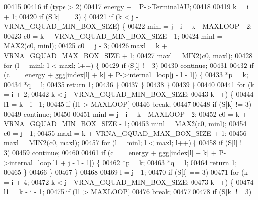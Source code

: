 \begin{DoxyCode}
00415 
00416   \textcolor{keywordflow}{if} (type > 2)
00417     energy += P->TerminalAU;
00418 
00419   k = i + 1;
00420   \textcolor{keywordflow}{if} (S[k] == 3) \{
00421     \textcolor{keywordflow}{if} (k < j - VRNA\_GQUAD\_MIN\_BOX\_SIZE) \{
00422       minl  = j - i + k - MAXLOOP - 2;
00423       c0    = k + VRNA\_GQUAD\_MIN\_BOX\_SIZE - 1;
00424       minl  = \hyperlink{group__utils_ga33297b3679c713b0c4d897cd0fe3b122}{MAX2}(c0, minl);
00425       c0    = j - 3;
00426       maxl  = k + VRNA\_GQUAD\_MAX\_BOX\_SIZE + 1;
00427       maxl  = \hyperlink{group__utils_gae0b9cd0ce090bd69b951aa73e8fa4f7d}{MIN2}(c0, maxl);
00428       \textcolor{keywordflow}{for} (l = minl; l < maxl; l++) \{
00429         \textcolor{keywordflow}{if} (S[l] != 3)
00430           \textcolor{keywordflow}{continue};
00431 
00432         \textcolor{keywordflow}{if} (c == energy + ggg[index[l] + k] + P->internal\_loop[j - l - 1]) \{
00433           *p  = k;
00434           *q  = l;
00435           \textcolor{keywordflow}{return} 1;
00436         \}
00437       \}
00438     \}
00439   \}
00440 
00441   \textcolor{keywordflow}{for} (k = i + 2;
00442        k < j - VRNA\_GQUAD\_MIN\_BOX\_SIZE;
00443        k++) \{
00444     l1 = k - i - 1;
00445     \textcolor{keywordflow}{if} (l1 > MAXLOOP)
00446       \textcolor{keywordflow}{break};
00447 
00448     \textcolor{keywordflow}{if} (S[k] != 3)
00449       \textcolor{keywordflow}{continue};
00450 
00451     minl  = j - i + k - MAXLOOP - 2;
00452     c0    = k + VRNA\_GQUAD\_MIN\_BOX\_SIZE - 1;
00453     minl  = \hyperlink{group__utils_ga33297b3679c713b0c4d897cd0fe3b122}{MAX2}(c0, minl);
00454     c0    = j - 1;
00455     maxl  = k + VRNA\_GQUAD\_MAX\_BOX\_SIZE + 1;
00456     maxl  = \hyperlink{group__utils_gae0b9cd0ce090bd69b951aa73e8fa4f7d}{MIN2}(c0, maxl);
00457     \textcolor{keywordflow}{for} (l = minl; l < maxl; l++) \{
00458       \textcolor{keywordflow}{if} (S[l] != 3)
00459         \textcolor{keywordflow}{continue};
00460 
00461       \textcolor{keywordflow}{if} (c == energy + ggg[index[l] + k] + P->internal\_loop[l1 + j - l - 1]) \{
00462         *p  = k;
00463         *q  = l;
00464         \textcolor{keywordflow}{return} 1;
00465       \}
00466     \}
00467   \}
00468 
00469   l = j - 1;
00470   \textcolor{keywordflow}{if} (S[l] == 3)
00471     \textcolor{keywordflow}{for} (k = i + 4;
00472          k < j - VRNA\_GQUAD\_MIN\_BOX\_SIZE;
00473          k++) \{
00474       l1 = k - i - 1;
00475       \textcolor{keywordflow}{if} (l1 > MAXLOOP)
00476         \textcolor{keywordflow}{break};
00477 
00478       \textcolor{keywordflow}{if} (S[k] != 3)

\end{DoxyCode}
